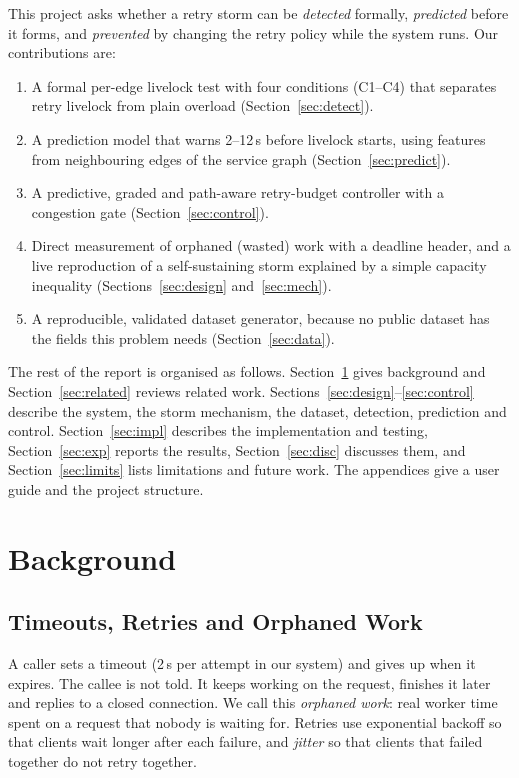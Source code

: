 \documentclass[conference,a4paper]{IEEEtran}
\begin{document}
This project asks whether a retry storm can be \emph{detected} formally, \emph{predicted} before it forms, and \emph{prevented} by changing the retry policy while the system runs. Our contributions are:
\begin{enumerate}
\item A formal per-edge livelock test with four conditions (C1--C4) that separates retry livelock from plain overload (Section~\ref{sec:detect}).
\item A prediction model that warns 2--12\,s before livelock starts, using features from neighbouring edges of the service graph (Section~\ref{sec:predict}).
\item A predictive, graded and path-aware retry-budget controller with a congestion gate (Section~\ref{sec:control}).
\item Direct measurement of orphaned (wasted) work with a deadline header, and a live reproduction of a self-sustaining storm explained by a simple capacity inequality (Sections~\ref{sec:design} and~\ref{sec:mech}).
\item A reproducible, validated dataset generator, because no public dataset has the fields this problem needs (Section~\ref{sec:data}).
\end{enumerate}

The rest of the report is organised as follows. Section~\ref{sec:bg} gives background and Section~\ref{sec:related} reviews related work. Sections~\ref{sec:design}--\ref{sec:control} describe the system, the storm mechanism, the dataset, detection, prediction and control. Section~\ref{sec:impl} describes the implementation and testing, Section~\ref{sec:exp} reports the results, Section~\ref{sec:disc} discusses them, and Section~\ref{sec:limits} lists limitations and future work. The appendices give a user guide and the project structure.

\section{Background}
\label{sec:bg}

\subsection{Timeouts, Retries and Orphaned Work}
A caller sets a timeout (2\,s per attempt in our system) and gives up when it expires. The callee is not told. It keeps working on the request, finishes it later and replies to a closed connection. We call this \emph{orphaned work}: real worker time spent on a request that nobody is waiting for. Retries use exponential backoff so that clients wait longer after each failure, and \emph{jitter} so that clients that failed together do not retry together.
\end{document}
